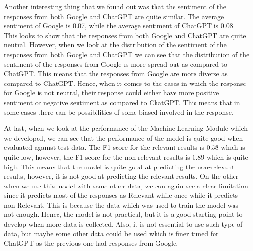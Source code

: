 \documentclass[50pt]{usiinfbachelorproject}
\begin{document}
Another interesting thing that we found out was that the sentiment of the responses from both Google and ChatGPT are quite similar. The average sentiment of Google is 0.07, while the average sentiment of ChatGPT is 0.08. This looks to show that the responses from both Google and ChatGPT are quite neutral. However, when we look at the distribution of the sentiment of the responses from both Google and ChatGPT we can see that the distribution of the sentiment of the responses from Google is more spread out as compared to ChatGPT. This means that the responses from Google are more diverse as compared to ChatGPT. Hence, when it comes to the cases in which the response for Google is not neutral, their response could either have more positive sentiment or negative sentiment as compared to ChatGPT. This means that in some cases there can be possibilities of some biased involved in the response.

At last, when we look at the performance of the Machine Learning Module which we developed, we can see that the performance of the model is quite good when evaluated against test data. The F1 score for the relevant results is 0.38 which is quite low, however, the F1 score for the non-relevant results is 0.89 which is quite high. This means that the model is quite good at predicting the non-relevant results, however, it is not good at predicting the relevant results. On the other when we use this model with some other data, we can again see a clear limitation since it predicts most of the responses as Relevant while once while it predicts non-Relevant. This is because the data which was used to train the model was not enough. Hence, the model is not practical, but it is a good starting point to develop when more data is collected. Also, it is not essential to use such type of data, but maybe some other data could be used which is finer tuned for ChatGPT as the previous one had responses from Google.

\end{document}
